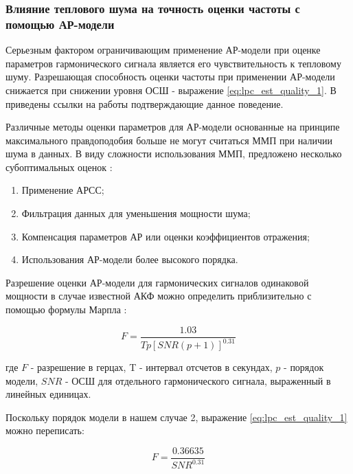 \subsubsection{Влияние теплового шума на точность оценки частоты с помощью АР-модели}
Серьезным фактором ограничивающим применение АР-модели при оценке параметров гармонического сигнала является
его чувствительность к тепловому шуму. Разрешающая способность оценки
частоты при применении АР-модели снижается при снижении уровня ОСШ - выражение \ref{eq:lpc_est_quality_1}.
В \cite{kay_ar_book} приведены ссылки на работы
\cite{lacoss_spectral_est, chen_spectral_est, marple_1977} подтверждающие данное поведение.

Различные методы оценки параметров для АР-модели основанные на принципе максимального правдоподобия больше не
могут считаться ММП при наличии шума в данных. В виду сложности использования ММП, предложено несколько 
субоптимальных оценок \cite{marpl_book, kay_ar_book}:
\begin{enumerate}
	\item Применение АРСС;
	\item Фильтрация данных для уменьшения мощности шума;
	\item Компенсация параметров АР или оценки коэффициентов отражения;
	\item Использования АР-модели более высокого порядка.
\end{enumerate}

Разрешение оценки АР-модели для гармонических сигналов одинаковой мощности в случае известной АКФ
можно определить приблизительно с помощью формулы Марпла \cite{marpl_book, kay_ar_book}:
\begin{center}
\begin{equation}
	\label{eq:lpc_est_quality_1}
	F = \frac{1.03}{Tp[SNR(p+1)]^{0.31}}
\end{equation}
\end{center}

где ${F}$ - разрешение в герцах, T - интервал отсчетов в секундах, ${p}$ - порядок модели,
${SNR}$ - ОСШ для отдельного гармонического сигнала, выраженный в линейных единицах.

Поскольку порядок модели в нашем случае 2, выражение \ref{eq:lpc_est_quality_1} можно переписать:
\begin{center}
\begin{equation}
	\label{eq:lpc_est_quality_2}
	F = \frac{0.36635}{SNR^{0.31}}
\end{equation}
\end{center}

